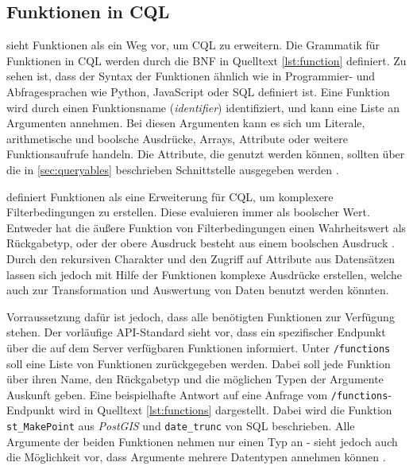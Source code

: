 \subsection{Funktionen in \acl{CQL}}
\label{sec:functions}

 sieht Funktionen als ein Weg vor, um \ac{CQL} zu erweitern. Die Grammatik für Funktionen in \ac{CQL} werden durch die \ac{BNF} in Quelltext \ref{lst:function} definiert. Zu sehen ist, dass der Syntax der Funktionen ähnlich wie in Programmier- und Abfragesprachen wie Python, JavaScript oder \ac{SQL} definiert ist. Eine Funktion wird durch einen Funktionsname (\textit{identifier}) identifiziert, und kann eine Liste an Argumenten annehmen. Bei diesen Argumenten kann es sich um Literale, arithmetische und boolsche Ausdrücke, Arrays, Attribute oder weitere Funktionsaufrufe handeln. Die Attribute, die genutzt werden können, sollten über die in \ref{sec:queryables} beschrieben Schnittstelle ausgegeben werden .



 definiert Funktionen als eine Erweiterung für \ac{CQL}, um komplexere Filterbedingungen zu erstellen. Diese evaluieren immer als boolscher Wert. Entweder hat die äußere Funktion von Filterbedingungen einen Wahrheitswert als Rückgabetyp, oder der obere Ausdruck besteht aus einem boolschen Ausdruck . Durch den rekursiven Charakter und den Zugriff auf Attribute aus Datensätzen lassen sich jedoch mit Hilfe der Funktionen komplexe Ausdrücke erstellen, welche auch zur Transformation und Auswertung von Daten benutzt werden könnten.

Vorraussetzung dafür ist jedoch, dass alle benötigten Funktionen zur Verfügung stehen. Der vorläufige \ac{API}-Standard sieht vor, dass ein spezifischer Endpunkt über die auf dem Server verfügbaren Funktionen informiert. Unter \texttt{/functions} soll eine Liste von Funktionen zurückgegeben werden. Dabei soll jede Funktion über ihren Name, den Rückgabetyp und die möglichen Typen der Argumente Auskunft geben. Eine beispielhafte Antwort auf eine Anfrage vom \texttt{/functions}-Endpunkt wird in Quelltext \ref{lst:functions} dargestellt. Dabei wird die Funktion \texttt{st\_MakePoint} aus \textit{PostGIS} und \texttt{date\_trunc} von \ac{SQL} beschrieben. Alle Argumente der beiden Funktionen nehmen nur einen Typ an -  sieht jedoch auch die Möglichkeit vor, dass Argumente mehrere Datentypen annehmen können .

